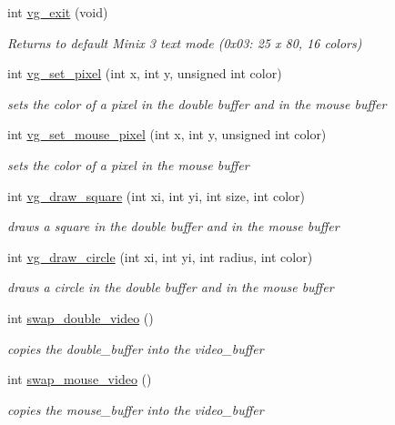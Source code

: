 \begin{DoxyCompactItemize}
int \hyperlink{group__video__gr_ga42f593e6656f1a978315aff02b1bcebf}{vg\+\_\+exit} (void)
\begin{DoxyCompactList}\small\item\em Returns to default Minix 3 text mode (0x03\+: 25 x 80, 16 colors) \end{DoxyCompactList}\item 
int \hyperlink{group__video__gr_ga729c07175ab64956c7fd9944d7676888}{vg\+\_\+set\+\_\+pixel} (int x, int y, unsigned int color)
\begin{DoxyCompactList}\small\item\em sets the color of a pixel in the double buffer and in the mouse buffer \end{DoxyCompactList}\item 
int \hyperlink{group__video__gr_ga78765c3e4634b79d0c27b464be410803}{vg\+\_\+set\+\_\+mouse\+\_\+pixel} (int x, int y, unsigned int color)
\begin{DoxyCompactList}\small\item\em sets the color of a pixel in the mouse buffer \end{DoxyCompactList}\item 
int \hyperlink{group__video__gr_gafcdcee0785e2e5a0d0f1f460bf436403}{vg\+\_\+draw\+\_\+square} (int xi, int yi, int size, int color)
\begin{DoxyCompactList}\small\item\em draws a square in the double buffer and in the mouse buffer \end{DoxyCompactList}\item 
int \hyperlink{group__video__gr_ga0410a09b926582249fb7c0a795c9d4fe}{vg\+\_\+draw\+\_\+circle} (int xi, int yi, int radius, int color)
\begin{DoxyCompactList}\small\item\em draws a circle in the double buffer and in the mouse buffer \end{DoxyCompactList}\item 
int \hyperlink{group__video__gr_gae50eb47e283e71498d323e815411acc3}{swap\+\_\+double\+\_\+video} ()
\begin{DoxyCompactList}\small\item\em copies the double\+\_\+buffer into the video\+\_\+buffer \end{DoxyCompactList}\item 
int \hyperlink{group__video__gr_ga8761e145d6f2249e0a4177ed7ff24299}{swap\+\_\+mouse\+\_\+video} ()
\begin{DoxyCompactList}\small\item\em copies the mouse\+\_\+buffer into the video\+\_\+buffer \end{DoxyCompactList}\item 

\end{DoxyCompactItemize}
